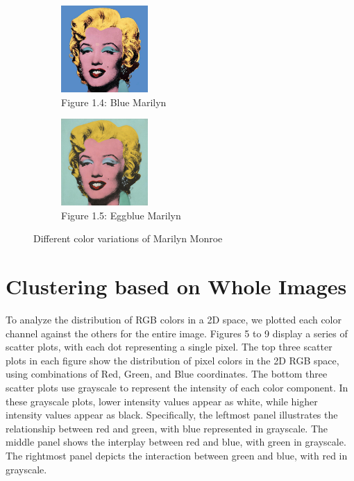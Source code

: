 \documentclass{article}
\begin{document}
\begin{figure}[ht]
  \begin{minipage}{0.6\textwidth}
    \centering
    \begin{subfigure}{0.45\textwidth}
      \centering
      \includegraphics[width=125px]{main_files/figure-latex/1_4_blue_marilyn.jpg}
      \caption{Figure 1.4: Blue Marilyn}
      \label{fig:1_4_blue_marilyn}
    \end{subfigure}
    \hfill
    \begin{subfigure}{0.45\textwidth}
      \centering
      \includegraphics[width=125px]{main_files/figure-latex/1_5_eggblue_marilyn.jpg}
      \caption{Figure 1.5: Eggblue Marilyn}
      \label{fig:1_5_eggblue_marilyn}
    \end{subfigure}
  \end{minipage}

  \caption{Different color variations of Marilyn Monroe}
  \label{fig:marilyn_variations}
\end{figure}

\hypertarget{clustering-based-on-whole-images}{%
\section{Clustering based on Whole
Images}\label{clustering-based-on-whole-images}}

To analyze the distribution of RGB colors in a 2D space, we plotted each
color channel against the others for the entire image. Figures 5 to 9
display a series of scatter plots, with each dot representing a single
pixel. The top three scatter plots in each figure show the distribution
of pixel colors in the 2D RGB space, using combinations of Red, Green,
and Blue coordinates. The bottom three scatter plots use grayscale to
represent the intensity of each color component. In these grayscale
plots, lower intensity values appear as white, while higher intensity
values appear as black. Specifically, the leftmost panel illustrates the
relationship between red and green, with blue represented in grayscale.
The middle panel shows the interplay between red and blue, with green in
grayscale. The rightmost panel depicts the interaction between green and
blue, with red in grayscale.
\end{document}
